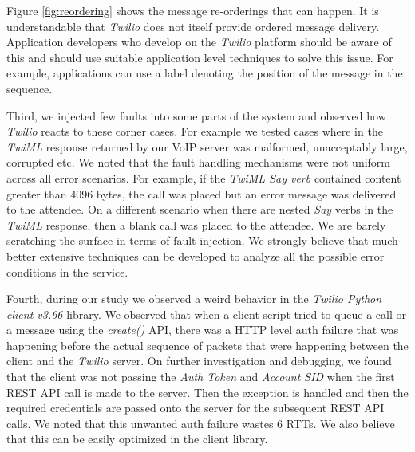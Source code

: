 Figure {\ref{fig:reordering}} shows the message re-orderings that can happen. It is understandable that \textit{Twilio} does not itself provide ordered message delivery. Application developers who develop on the \textit{Twilio} platform should be aware of this and should use suitable application level techniques to solve this issue. For example, applications can use a label denoting the position of the message in the sequence. 

Third, we injected few faults into some parts of the system and observed how \textit{Twilio} reacts to these corner cases. For example we tested cases where in the \textit{TwiML} response returned by our VoIP server was malformed, unacceptably large, corrupted etc. We noted that the fault handling mechanisms were not uniform across all error scenarios. For example, if the \textit{TwiML Say verb} contained content greater than 4096 bytes, the call was placed but an error message was delivered to the attendee. On a different scenario when there are nested \textit{Say} verbs in the \textit{TwiML} response, then a blank call was placed to the attendee. We are barely scratching the surface in terms of fault injection. We strongly believe that much better extensive techniques can be developed to analyze all the possible error conditions in the service.  

Fourth, during our study we observed a weird behavior in the \textit{Twilio Python client v3.66} library. We observed that when a client script tried to queue a call or a message using the \textit{create()} API, there was a HTTP level auth failure that was happening before the actual sequence of packets that were happening between the client and the \textit{Twilio} server. On further investigation and debugging, we found that the client was not passing the \textit{Auth Token} and \textit{Account SID} when the first REST API call is made to the server. Then the exception is handled and then the required credentials are passed onto the server for the subsequent REST API calls. We noted that this unwanted auth failure wastes 6 RTTs. We also believe that this can be easily optimized in the client library. 

